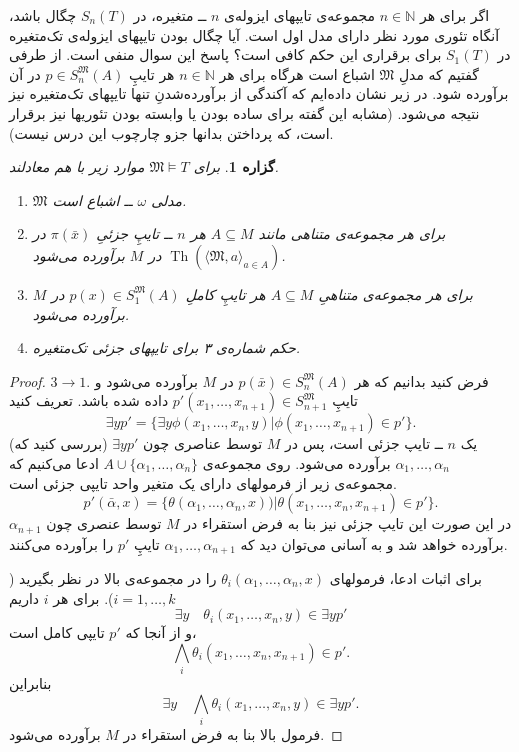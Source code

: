 \documentclass[12pt,a4paper]{report}
\theoremstyle{colorhead}
\newtheorem{prop}[thm]{گزاره}
\DeclareMathOperator{\Th}{Th}
\begin{document}
اگر برای
هر
$n\in \mathbb{N}$
مجموعه‌ی
تایپهای ایزوله‌ی
$n$
ــ
متغیره‌، در
$S_n(T)$
چگال باشد، آنگاه تئوری مورد نظر دارای مدل اول است. آیا 
چگال بودن تایپهای ایزوله‌ی تک‌متغیره‌ در
$S_1(T)$
برای برقراری  این حکم کافی است؟ پاسخ این سوال منفی است. از طرفی گفتیم که مدلِ
$\mathfrak{M}$
اشباع است هرگاه برای هر
$n\in \mathbb{N}$
هر تایپِ
$p\in S_n^\mathfrak{M}(A)$
در آن برآورده شود. در زیر نشان داده‌ایم
که آکندگی از برآورده‌شدنِ تنها تایپهای تک‌متغیره نیز نتیجه می‌شود.
(مشابه این گفته برای ساده بودن یا وابسته بودن تئوریها نیز برقرار است، که پرداختن بدانها جزو چارچوب این درس نیست).
\begin{prop}
برای
$\mathfrak{M}\models T$
موارد زیر با هم معادلند.
\begin{enumerate}
\item
$\mathfrak{M}$
مدلی 
$\omega$ 
ــ 
اشباع است.
\item
برای هر مجموعه‌ی متناهی مانند
$A\subseteq M$
هر
$n$ ــ
تایپِ جزئیِ
$\pi(\bar{x})$
در
$\Th(\langle\mathfrak{M},a\rangle_{a\in  A})$
در
$M$
برآورده می‌شود.
\item
برای هر مجموعه‌ی متناهیِ
$A\subseteq M$
هر تایپِ کاملِ
$p(x)\in S_1^\mathfrak{M}(A)$
در
$M$
برآورده می‌شود.
\item 
حکم شماره‌ی ۳ برای تایپهای جزئی تک‌متغیره.
\end{enumerate}
\end{prop}
\begin{proof}
$3\to 1$.
فرض کنید 
بدانیم که
هر
$p(\bar{x})\in S_n^{\mathfrak{M}}(A)$
در
$M$
برآورده می‌شود و تایپِ
$p'(x_1,\ldots,x_{n+1})\in S_{n+1}^{\mathfrak{M}}$
داده شده باشد. تعریف کنید
\[
\exists y p'=\{\exists y \phi(x_1,\ldots,x_{n}, y)| \phi(x_1,\ldots,x_{n+1})\in p'\}.
\]
(بررسی کنید که)
$\exists y p'$
یک
$n$ ــ
تایپ جزئی است، پس در
$M$
توسط عناصری چون
$\alpha_1,\ldots,\alpha_n$
برآورده می‌شود. روی مجموعه‌ی
$A\cup \{\alpha_1,\ldots,\alpha_n\}$
ادعا می‌کنیم که مجموعه‌ی زیر از فرمولهای دارای یک متغیر واحد تایپی جزئی است.
\[
p'(\bar{\alpha},x)=\{\theta(\alpha_1,\ldots,\alpha_n,x))|\theta(x_1,\ldots,x_n,x_{n+1})\in p'\}.
\]
در این صورت
این تایپ جزئی نیز بنا به فرض استقراء در
$M$
توسط عنصری چون
$\alpha_{n+1}$
برآورده خواهد شد و به آسانی می‌توان دید که 
$\alpha_1,\ldots,\alpha_{n+1}$
تایپِ
$p'$
را برآورده می‌کنند. 
\par 
برای اثبات ادعا، فرمولهای
$\theta_i(\alpha_1,\ldots,\alpha_n,x)$
را در مجموعه‌ی بالا در نظر بگیرید
 (\mbox{$i=1,\ldots,k$}).
برای هر
$i$
داریم
\[\exists y\quad \theta_i(x_1,\ldots,x_n,y)\in \exists y p'\]
و
از آنجا که 
$p'$
تایپی کامل است،
\[
\bigwedge_i \theta_i (x_1,\ldots,x_n,x_{n+1})\in p'.
\]
بنابراین
\[
\exists y\quad \bigwedge_i \theta_i(x_1,\ldots,x_n,y)\in \exists y p'.
\]
فرمول بالا بنا به فرض استقراء در
$M$
برآورده می‌شود.
\end{proof}
\end{document}

